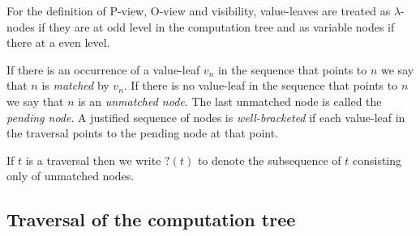 \documentclass{llncs}
\begin{document}
For the definition of P-view, O-view and visibility, value-leaves are treated as
$\lambda$-nodes if they are at odd level in the computation tree and
as variable nodes if there at a even level.

If there is an occurrence of a value-leaf $v_n$ in the sequence that points to $n$ we say that
$n$ is \emph{matched} by $v_n$. If there is no value-leaf in the sequence that points to $n$ we
say that $n$ is an \emph{unmatched node}.
The last unmatched node is called the \emph{pending node}.
A justified sequence of nodes is \emph{well-bracketed} if each value-leaf in the traversal points to the pending node at that point.

If $t$ is a traversal then we write $?(t)$ to denote the subsequence of $t$ consisting only of unmatched nodes.

\subsection{Traversal of the computation tree}
\label{subsec:traversal}
\end{document}

